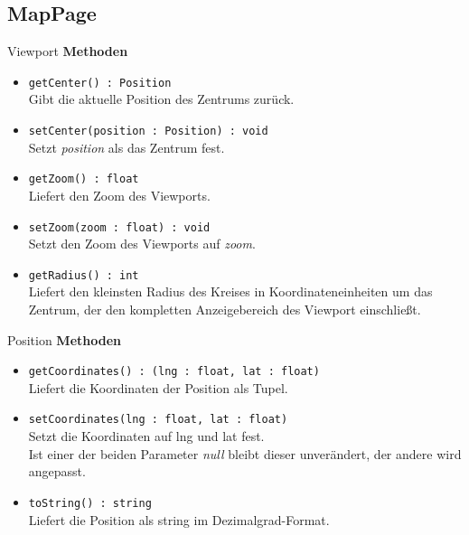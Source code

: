 \subsection{MapPage}

    \begin{Class}{Viewport}
        \textbf{Methoden}
        \begin{itemize}
            \item \texttt{getCenter() : Position}
            \\ Gibt die aktuelle Position des Zentrums zurück.
            \item \texttt{setCenter(position : Position) : void}
            \\ Setzt \emph{position} als das Zentrum fest.
            \item \texttt{getZoom() : float}
            \\ Liefert den Zoom des Viewports.
            \item \texttt{setZoom(zoom : float) : void}
            \\ Setzt den Zoom des Viewports auf \emph{zoom}.
            \item \texttt{getRadius() : int}
            \\ Liefert den kleinsten Radius des Kreises in Koordinateneinheiten um das Zentrum,
            der den kompletten Anzeigebereich des Viewport einschließt.
        \end{itemize}
    \end{Class}

    \begin{Class}{Position}
        \textbf{Methoden}
        \begin{itemize}
            \\ Die gleiche Klasse gibt es schon in Model. Erfüllt sie einen unterschiedlichen Zweck? Ansonsten löschen!!1!
            \item \texttt{getCoordinates() : (lng : float, lat : float)}
            \\ Liefert die Koordinaten der Position als Tupel.
            \item \texttt{setCoordinates(lng : float, lat : float)}
            \\ Setzt die Koordinaten auf lng und lat fest.
            \\ Ist einer der beiden Parameter \emph{null} bleibt dieser unverändert, der andere wird angepasst.
            \item \texttt{toString() : string}
            \\ Liefert die Position als string im Dezimalgrad-Format.
        \end{itemize}
    \end{Class}

